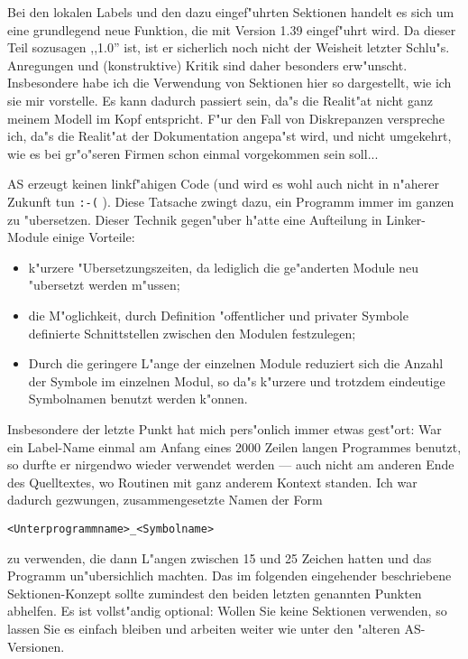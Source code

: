\documentclass[12pt,a4paper,twoside]{report}
\newcommand{\tty}[1]{{\tt #1}}
\begin{document}
{Bei den lokalen Labels und den dazu eingef"uhrten Sektionen handelt es
sich um eine grundlegend neue Funktion, die mit Version 1.39 eingef"uhrt
wird.  Da dieser Teil sozusagen ,,1.0'' ist, ist er sicherlich noch nicht
der Weisheit letzter Schlu"s.  Anregungen und (konstruktive) Kritik sind
daher besonders erw"unscht.  Insbesondere habe ich die Verwendung von
Sektionen hier so dargestellt, wie ich sie mir vorstelle.  Es kann dadurch
passiert sein, da"s die Realit"at nicht ganz meinem Modell im Kopf entspricht.
F"ur den Fall von Diskrepanzen verspreche ich, da"s die Realit"at der
Dokumentation angepa"st wird, und nicht umgekehrt, wie es bei gr"o"seren
Firmen schon einmal vorgekommen sein soll...
\par
AS erzeugt keinen linkf"ahigen Code (und wird es wohl auch nicht in n"aherer
Zukunft tun \tty{:-(} ).  Diese Tatsache zwingt dazu, ein Programm immer im ganzen
zu "ubersetzen.  Dieser Technik gegen"uber h"atte eine Aufteilung in
Linker-Module einige Vorteile:
\begin{itemize}
\item{k"urzere "Ubersetzungszeiten, da lediglich die ge"anderten Module
      neu "ubersetzt werden m"ussen;}
\item{die M"oglichkeit, durch Definition "offentlicher und privater
      Symbole definierte Schnittstellen zwischen den Modulen festzulegen;}
\item{Durch die geringere L"ange der einzelnen Module reduziert sich die
      Anzahl der Symbole im einzelnen Modul, so da"s k"urzere und trotzdem
      eindeutige Symbolnamen benutzt werden k"onnen.}
\end{itemize}
Insbesondere der letzte Punkt hat mich pers"onlich immer etwas gest"ort:
War ein Label-Name einmal am Anfang eines 2000 Zeilen langen Programmes
benutzt, so durfte er nirgendwo wieder verwendet werden --- auch nicht am
anderen Ende des Quelltextes, wo Routinen mit ganz anderem Kontext standen.
Ich war dadurch gezwungen, zusammengesetzte Namen der Form
\begin{verbatim}
<Unterprogrammname>_<Symbolname>
\end{verbatim}
zu verwenden, die dann L"angen zwischen 15 und 25 Zeichen hatten und das
Programm un"ubersichlich machten.
Das im folgenden eingehender beschriebene Sektionen-Konzept sollte zumindest
den beiden letzten genannten Punkten abhelfen.  Es ist vollst"andig optional:
Wollen Sie keine Sektionen verwenden, so lassen Sie es einfach bleiben
und arbeiten weiter wie unter den "alteren AS-Versionen.

}
\end{document}
